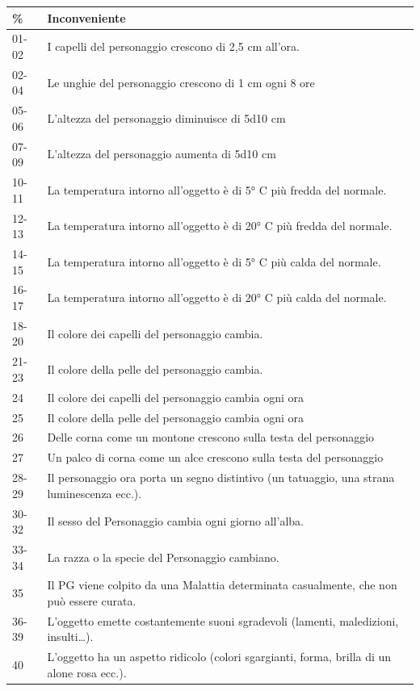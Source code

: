 \noindent\begin{tabularx}{\linewidth}{lX}
	\toprule
\rowcolor{gray!20}\textbf{\%} & \textbf{Inconveniente}\\
\toprule
01-02& I capelli del personaggio crescono di 2,5 cm all'ora.\\
\rowcolor{gray!20}02-04& Le unghie del personaggio crescono di 1 cm ogni 8 ore\\
05-06 & L'altezza del personaggio diminuisce di 5d10 cm \\
\rowcolor{gray!20}07-09 & L'altezza del personaggio aumenta di 5d10 cm \\
10-11 & La temperatura intorno all'oggetto è di 5° C più fredda del normale.\\
\rowcolor{gray!20}12-13 & La temperatura intorno all'oggetto è di 20° C più fredda del normale.\\
14-15 & La temperatura intorno all'oggetto è di 5° C più calda del normale.\\
\rowcolor{gray!20}16-17 & La temperatura intorno all'oggetto è di 20° C più calda del normale.\\
18-20 & Il colore dei capelli del personaggio cambia.\\
\rowcolor{gray!20}21-23 & Il colore della pelle del personaggio cambia.\\
24& Il colore dei capelli del personaggio cambia ogni ora\\
\rowcolor{gray!20}25& Il colore della pelle del personaggio cambia ogni ora\\
26& Delle corna come un montone crescono sulla testa del personaggio\\
\rowcolor{gray!20}27& Un palco di corna come un alce crescono sulla testa del personaggio\\
28-29 & Il personaggio ora porta un segno distintivo (un tatuaggio, una strana luminescenza ecc.).\\
\rowcolor{gray!20}30-32 & Il sesso del Personaggio cambia ogni giorno all'alba.\\
33-34 & La razza o la specie del Personaggio cambiano.\\
\rowcolor{gray!20}35& Il PG viene colpito da una Malattia determinata casualmente, che non può essere curata.\\
36-39 & L'oggetto emette costantemente suoni sgradevoli (lamenti, maledizioni, insulti…).\\
\rowcolor{gray!20}40& L'oggetto ha un aspetto ridicolo (colori sgargianti, forma, brilla di un alone rosa ecc.).\\

\end{tabularx}
